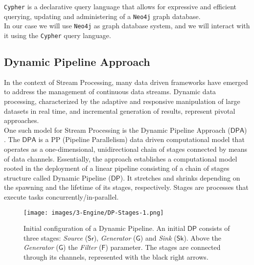 \texttt{Cypher} \cite{cypher-query-language} is a declarative query language that allows for expressive and efficient querying, updating and administering of a \texttt{Neo4j} graph database.\\

In our case we will use \texttt{Neo4j} as graph database system, and we will interact with it using the \texttt{Cypher} query language.

\subsection{Dynamic Pipeline Approach}\label{DPP}

In the context of Stream Processing, many data driven frameworks have emerged to address the management of continuous data streams. Dynamic data processing, characterized by the adaptive and responsive manipulation of large datasets in real time, and incremental generation of results, represent pivotal approaches.\\

One such model for Stream Processing is the Dynamic Pipeline Approach ($\mathsf{DPA}$) \cite{DP-pasarella2024computational}. The $\mathsf{DPA}$ is a PP (Pipeline Parallelism) data driven computational model that operates as a one-dimensional, unidirectional chain of stages connected by means of data channels. Essentially, the approach establishes a computational model rooted in the deployment of a linear pipeline consisting of a chain of stages structure called Dynamic Pipeline ($\mathsf{DP}$). It stretches and
shrinks depending on the spawning and the lifetime of its stages, respectively. Stages are processes that execute tasks concurrently/in-parallel.\\

\begin{figure}[H]
  \centering
  \texttt{[image: images/3-Engine/DP-Stages-1.png]}
  \caption{Initial configuration of a Dynamic Pipeline. An initial $\mathsf{DP}$ consists of three stages: \emph{Source} ($\mathsf{Sr}$), \emph{Generator} ($\mathsf{G}$) and \emph{Sink} ($\mathsf{Sk}$). Above the  \emph{Generator} ($\mathsf{G}$) the \emph{Filter} ($\mathsf{F}$) parameter. The stages are connected through its channels, represented with the black right arrows.}
  \label{img:DP-Stages-1}
\end{figure}

